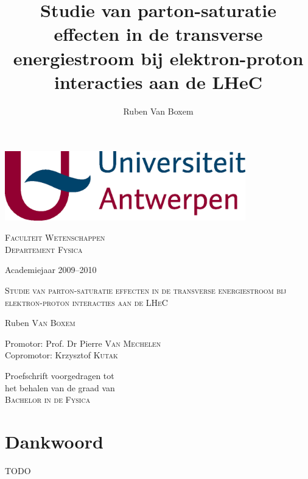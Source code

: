 \documentclass[a4paper,11pt]{article}
\title{Studie van parton-saturatie effecten in de transverse energiestroom bij elektron-proton interacties aan de LHeC}
\author{Ruben Van Boxem}
\numberwithin{equation}{section} %
\begin{document}
\fontsize{12pt}{14pt}\selectfont

\begin{center}

\includegraphics[height=3cm]{Afbeeldingen/UA.eps}

\vspace{1cm}

\fontsize{14pt}{17pt}\selectfont
\textsc{Faculteit Wetenschappen} \\
\textsc{Departement Fysica}
\fontsize{12pt}{14pt}\selectfont
\vspace{0.3cm}

\vspace{1.2cm}

Academiejaar 2009--2010

\vspace{2.8cm}

\fontsize{17.28pt}{21pt}\selectfont

\textsc{Studie van parton-saturatie effecten in de transverse energiestroom bij elektron-proton interacties aan de LHeC}

\fontsize{12pt}{14pt}\selectfont

\vspace{3cm}

Ruben \textsc{Van Boxem}	

\vspace{2cm}

Promotor: Prof. Dr Pierre \textsc{Van Mechelen}\\
Copromotor: Krzysztof \textsc{Kutak} \\
\vspace{2cm}
\end{center}
Proefschrift voorgedragen tot \\
het behalen van de graad van\\
\textsc{Bachelor in de Fysica}

\thispagestyle{empty}
\newpage

\section*{Dankwoord}
TODO
\thispagestyle{empty}
\newpage
\fontsize{11pt}{14pt}\selectfont
\end{document}
